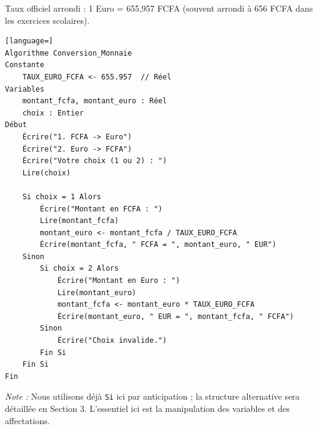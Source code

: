 \documentclass[11pt]{article}
\begin{document}
\begin{exemplebox}
Taux officiel arrondi : 1 Euro = 655,957 FCFA (souvent arrondi à 656 FCFA dans les exercices scolaires).
\begin{lstlisting}[language=]
Algorithme Conversion_Monnaie
Constante
    TAUX_EURO_FCFA <- 655.957  // Réel
Variables
    montant_fcfa, montant_euro : Réel
    choix : Entier
Début
    Écrire("1. FCFA -> Euro")
    Écrire("2. Euro -> FCFA")
    Écrire("Votre choix (1 ou 2) : ")
    Lire(choix)
    
    Si choix = 1 Alors
        Écrire("Montant en FCFA : ")
        Lire(montant_fcfa)
        montant_euro <- montant_fcfa / TAUX_EURO_FCFA
        Écrire(montant_fcfa, " FCFA = ", montant_euro, " EUR")
    Sinon
        Si choix = 2 Alors
            Écrire("Montant en Euro : ")
            Lire(montant_euro)
            montant_fcfa <- montant_euro * TAUX_EURO_FCFA
            Écrire(montant_euro, " EUR = ", montant_fcfa, " FCFA")
        Sinon
            Écrire("Choix invalide.")
        Fin Si
    Fin Si
Fin
\end{lstlisting}
\emph{Note :} Nous utilisons déjà \texttt{Si} ici par anticipation ; la structure alternative sera détaillée en Section 3. L'essentiel ici est la manipulation des variables et des affectations.
\end{exemplebox}
\end{document}
